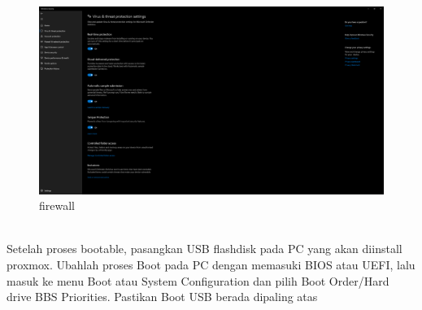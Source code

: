 \documentclass{article}
\begin{document}
  \begin{figure}[h!]
    \centering
    \includegraphics[width=0.7\linewidth]{firewall.png}
    \caption{firewall}
  \end{figure}
  \\ Setelah proses bootable, pasangkan USB flashdisk pada PC yang akan diinstall proxmox. Ubahlah proses Boot pada PC dengan memasuki BIOS atau UEFI,
  lalu masuk ke menu Boot atau System Configuration dan pilih Boot Order/Hard drive BBS Priorities. Pastikan Boot USB berada dipaling atas
  \newpage
\end{document}
